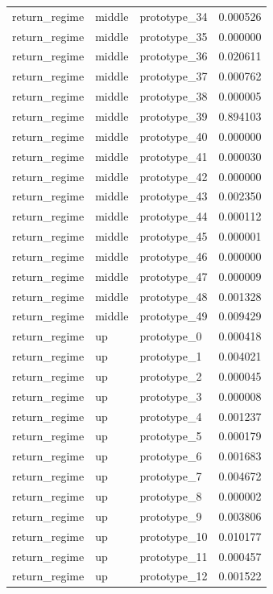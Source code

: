 \begin{tabular}{lllr}
return\_regime & middle & prototype\_34 & 0.000526 \\
return\_regime & middle & prototype\_35 & 0.000000 \\
return\_regime & middle & prototype\_36 & 0.020611 \\
return\_regime & middle & prototype\_37 & 0.000762 \\
return\_regime & middle & prototype\_38 & 0.000005 \\
return\_regime & middle & prototype\_39 & 0.894103 \\
return\_regime & middle & prototype\_40 & 0.000000 \\
return\_regime & middle & prototype\_41 & 0.000030 \\
return\_regime & middle & prototype\_42 & 0.000000 \\
return\_regime & middle & prototype\_43 & 0.002350 \\
return\_regime & middle & prototype\_44 & 0.000112 \\
return\_regime & middle & prototype\_45 & 0.000001 \\
return\_regime & middle & prototype\_46 & 0.000000 \\
return\_regime & middle & prototype\_47 & 0.000009 \\
return\_regime & middle & prototype\_48 & 0.001328 \\
return\_regime & middle & prototype\_49 & 0.009429 \\
return\_regime & up & prototype\_0 & 0.000418 \\
return\_regime & up & prototype\_1 & 0.004021 \\
return\_regime & up & prototype\_2 & 0.000045 \\
return\_regime & up & prototype\_3 & 0.000008 \\
return\_regime & up & prototype\_4 & 0.001237 \\
return\_regime & up & prototype\_5 & 0.000179 \\
return\_regime & up & prototype\_6 & 0.001683 \\
return\_regime & up & prototype\_7 & 0.004672 \\
return\_regime & up & prototype\_8 & 0.000002 \\
return\_regime & up & prototype\_9 & 0.003806 \\
return\_regime & up & prototype\_10 & 0.010177 \\
return\_regime & up & prototype\_11 & 0.000457 \\
return\_regime & up & prototype\_12 & 0.001522 \\

\end{tabular}
